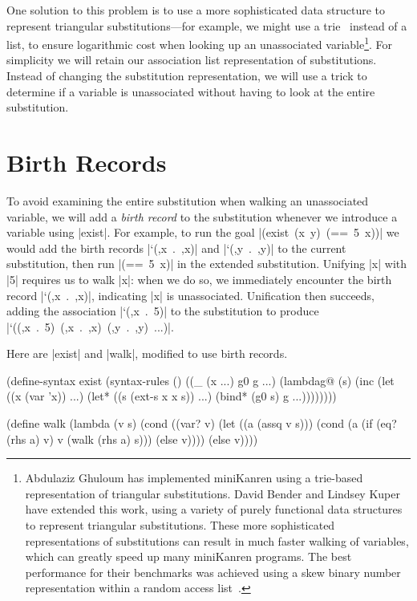 One solution to this problem is to use a more sophisticated data
structure to represent triangular substitutions---for example, we
might use a trie~\cite{triememory} instead of a list, to ensure logarithmic
cost when looking up an unassociated variable\footnote{Abdulaziz
  Ghuloum has implemented miniKanren using a trie-based representation
  of triangular substitutions.  David Bender and Lindsey Kuper have
  extended this work, using a variety of purely functional data
  structures to represent triangular substitutions.  These more
  sophisticated representations of substitutions can result in much
  faster walking of variables, which can greatly speed up many
  miniKanren programs.  The best performance for their benchmarks
  was achieved using a skew binary number representation within a
  random access list~\cite{randomaccesslists}.}.  For simplicity we
will retain our association list representation of substitutions.
Instead of changing the substitution representation, we will use a
trick to determine if a variable is unassociated without having to
look at the entire substitution.

\section{Birth Records}\label{birthrecords}

To avoid examining the entire substitution when walking an
unassociated variable, we will add a \emph{birth record} to the
substitution whenever we introduce a variable using
\mbox{\scheme|exist|}.  For example, to run the goal
\mbox{\scheme|(exist (x y) (== 5 x))|} we would add the birth records
\mbox{\scheme|`(,x . ,x)|} and
\mbox{\scheme|`(,y . ,y)|} to the current substitution, then run
\mbox{\scheme|(== 5 x)|} in the extended substitution.  
Unifying \mbox{\scheme|x|} with \mbox{\scheme|5|} requires us to walk \mbox{\scheme|x|}:
when we do so, we immediately encounter the birth record \mbox{\scheme|`(,x . ,x)|},
indicating \mbox{\scheme|x|} is unassociated.  Unification then succeeds, adding the association
\mbox{\scheme|`(,x . 5)|} to the substitution to produce \mbox{\scheme|`((,x . 5) (,x . ,x) (,y . ,y) ...)|}.

Here are \mbox{\scheme|exist|} and \mbox{\scheme|walk|}, modified to use birth records.

\schemedisplayspace
\begin{schemedisplay}
(define-syntax exist
  (syntax-rules ()
    ((_ (x ...) g0 g ...)
     (lambdag@ (s)
       (inc
         (let ((x (var 'x)) ...)
           (let* ((s (ext-s x x s))
                  ...)
             (bind* (g0 s) g ...))))))))
\end{schemedisplay}
\newpage
\begin{schemedisplay}    
(define walk
  (lambda (v s)
    (cond
      ((var? v)
       (let ((a (assq v s)))
         (cond
           (a (if (eq? (rhs a) v) v (walk (rhs a) s)))
           (else v))))
      (else v))))
\end{schemedisplay}

